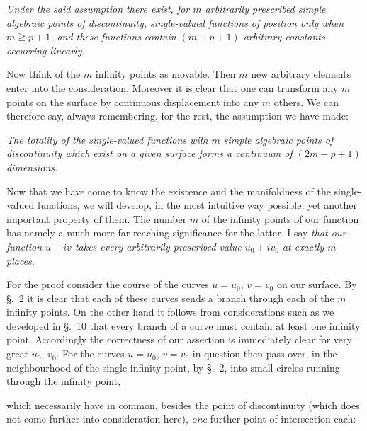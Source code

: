 \documentclass{article}
\begin{document}

\emph{Under the said assumption there exist, for $m$ arbitrarily prescribed simple algebraic points of discontinuity, single-valued functions of position only when $m \geqq p + 1$, and these functions contain $(m - p + 1)$ arbitrary constants occurring linearly.}

Now think of the $m$ infinity points as movable. Then $m$ new arbitrary elements enter into the consideration. Moreover it is clear that one can transform any $m$ points on the surface by continuous displacement into any $m$ others. We can therefore say, always remembering, for the rest, the assumption we have made:

\emph{The totality of the single-valued functions with $m$ simple algebraic points of discontinuity which exist on a given surface forms a continuum of $(2m - p + 1)$ dimensions.}

Now that we have come to know the existence and the manifoldness of the single-valued functions, we will develop, in the most intuitive way possible, yet another important property of them. The number $m$ of the infinity points of our function has namely a much more far-reaching significance for the latter. I say \emph{that our function $u + iv$ takes every arbitrarily prescribed value $u_{0} + iv_{0}$ at exactly $m$ places.}

For the proof consider the course of the curves $u = u_{0}$, $v = v_{0}$ on our surface. By §.~2 it is clear that each of these curves sends a branch through each of the $m$ infinity points. On the other hand it follows from considerations such as we developed in §.~10 that every branch of a curve must contain at least one infinity point. Accordingly the correctness of our assertion is immediately clear for very great $u_{0}$, $v_{0}$. For the curves $u = u_{0}$, $v = v_{0}$ in question then pass over, in the neighbourhood of the single infinity point, by §.~2, into small circles running through the infinity point,

which necessarily have in common, besides the point of discontinuity (which does not come further into consideration here), \emph{one} further point of intersection each:

\end{document}
